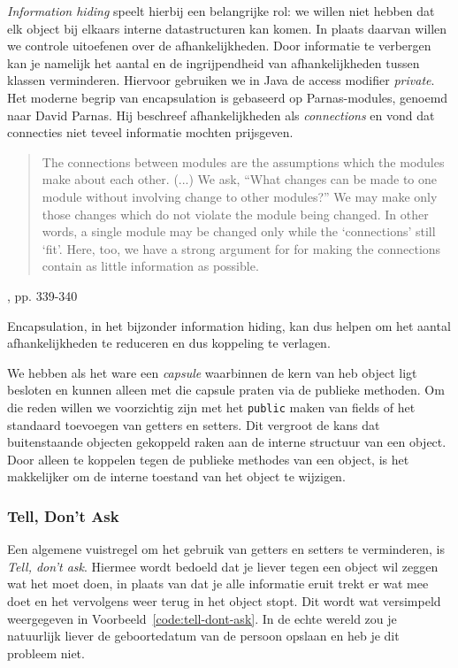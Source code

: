 \textit{Information hiding} speelt hierbij een belangrijke 
rol: we willen niet hebben dat elk object bij elkaars 
interne datastructuren kan komen. In plaats daarvan 
willen we controle uitoefenen over de afhankelijkheden.
Door informatie te verbergen kan je namelijk het aantal 
en de ingrijpendheid van afhankelijkheden tussen 
klassen verminderen. Hiervoor gebruiken we in Java
de access modifier \textit{private}.
Het moderne begrip van encapsulation is gebaseerd op 
Parnas-modules, genoemd naar David Parnas.
Hij beschreef afhankelijkheden als \emph{connections}
en vond dat connecties niet teveel informatie mochten prijsgeven.
\blockquote{
    The connections between modules are the assumptions
    which the modules make about each other.
    \newline\newline
    (...)
    \newline\newline
    We ask, ``What changes can be made to one module
    without involving change to other modules?'' 
    We may make only those changes which do not violate
    the module being changed. In other words,
    a single module may be changed only while the `connections'
    still `fit'. Here, too, we have a strong argument for
    for making the connections contain as little information as possible.
}{\cite{Parnas1971}, pp. 339-340}

Encapsulation, in het bijzonder information hiding,
kan dus helpen om het aantal afhankelijkheden te reduceren
en dus koppeling te verlagen. 

We hebben als het ware een \textit{capsule}
waarbinnen de kern van heb object ligt besloten en kunnen alleen met die 
capsule praten via de publieke methoden. Om die reden willen we voorzichtig
zijn met het \texttt{public} maken van fields of het standaard toevoegen van 
getters en setters. Dit vergroot de kans dat buitenstaande objecten gekoppeld 
raken aan de interne structuur van een object. Door alleen te koppelen tegen 
de publieke methodes van een object, is het makkelijker om de interne toestand 
van het object te wijzigen.

\subsubsection{Tell, Don't Ask}
Een algemene vuistregel om het gebruik van getters en setters te verminderen,
is \textit{Tell, don't ask}. Hiermee wordt bedoeld dat je liever tegen een object 
wil zeggen wat het moet doen, in plaats van dat je alle informatie eruit trekt
er wat mee doet en het vervolgens weer terug in het object stopt. 
Dit wordt wat versimpeld weergegeven in Voorbeeld~\ref{code:tell-dont-ask}.
In de echte wereld zou je natuurlijk liever de geboortedatum van de persoon 
opslaan en heb je dit probleem niet.

